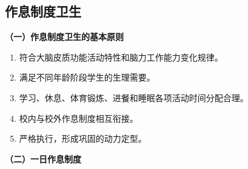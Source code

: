 \subsection{作息制度卫生}

\begin{keybox}
\textbf{（一）作息制度卫生的基本原则}

\begin{enumerate}[leftmargin=*]
    \item 符合大脑皮质功能活动特性和脑力工作能力变化规律。
    \item 满足不同年龄阶段学生的生理需要。
    \item 学习、休息、体育锻炼、进餐和睡眠各项活动时间分配合理。
    \item 校内与校外作息制度相互衔接。
    \item 严格执行，形成巩固的动力定型。
\end{enumerate}

\textbf{（二）一日作息制度}


\end{keybox}
